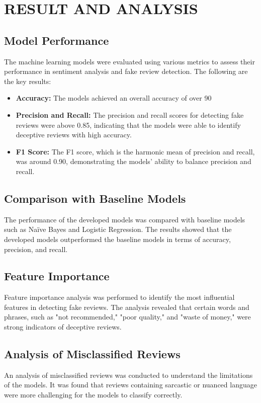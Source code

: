 \chapter{RESULT AND ANALYSIS}
\section{Model Performance}
The machine learning models were evaluated using various metrics to assess their performance in sentiment analysis and fake review detection. The following are the key results:

\begin{itemize}
\item \textbf{Accuracy:} The models achieved an overall accuracy of over 90%
\item \textbf{Precision and Recall:} The precision and recall scores for detecting fake reviews were above 0.85, indicating that the models were able to identify deceptive reviews with high accuracy.
\item \textbf{F1 Score:} The F1 score, which is the harmonic mean of precision and recall, was around 0.90, demonstrating the models' ability to balance precision and recall.
\end{itemize}

\section{Comparison with Baseline Models}
The performance of the developed models was compared with baseline models such as Naïve Bayes and Logistic Regression. The results showed that the developed models outperformed the baseline models in terms of accuracy, precision, and recall.

\section{Feature Importance}
Feature importance analysis was performed to identify the most influential features in detecting fake reviews. The analysis revealed that certain words and phrases, such as "not recommended," "poor quality," and "waste of money," were strong indicators of deceptive reviews.

\section{Analysis of Misclassified Reviews}
An analysis of misclassified reviews was conducted to understand the limitations of the models. It was found that reviews containing sarcastic or nuanced language were more challenging for the models to classify correctly.

